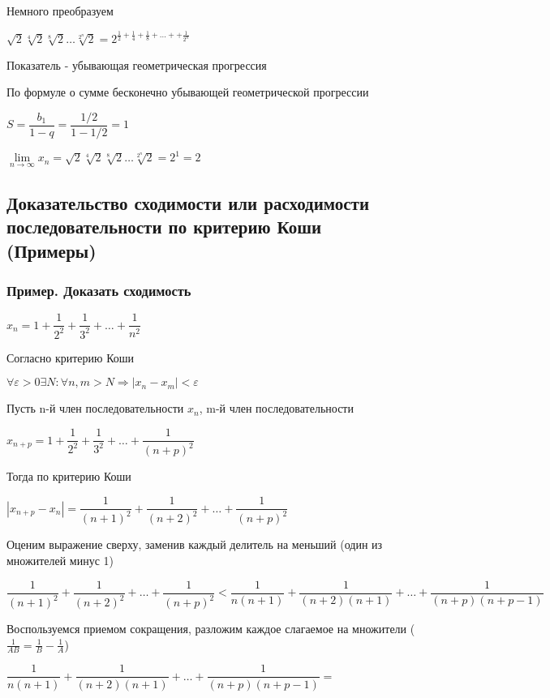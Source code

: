 Немного преобразуем

$ \sqrt{2} \sqrt[4]{2} \sqrt[8]{2} \ldots \sqrt[2^{n}]{2} =
2^{\frac{1}{2} + \frac{1}{4} + \frac{1}{8} + \ldots + + \frac{1}{2^{n}}}
$

Показатель - убывающая геометрическая прогрессия

По формуле о сумме бесконечно убывающей геометрической прогрессии

$S = \dfrac{b_{1}}{1 - q} = \dfrac{1/2}{1 - 1/2} = 1$

$  \lim\limits_{n \to \infty} x_{n} = 
\sqrt{2} \sqrt[4]{2} \sqrt[8]{2} \ldots \sqrt[2^{n}]{2} = 
2^{1} = 2 $


\subsection{Доказательство сходимости или расходимости последовательности по критерию Коши (Примеры)}

\subsubsection{Пример. Доказать сходимость}

$ x_{n} = 1 +
\dfrac{1}{2^{2}} + 
\dfrac{1}{3^{2}} + 
\ldots +
\dfrac{1}{n^{2}}
$

Согласно критерию Коши

$ \forall \varepsilon > 0 \exists N: \forall n,m > N \Rightarrow |x_{n} - x_{m}| < \varepsilon $

Пусть n-й член последовательности $ x_{n} $, 
m-й член последовательности 

$ x_{n+p} = 1 + \dfrac{1}{2^{2}} + 
\dfrac{1}{3^{2}} + 
\ldots +
\dfrac{1}{(n+p)^{2}} $

Тогда по критерию Коши

$ |x_{n+p} - x_{n}| = 
\dfrac{1}{(n+1)^{2}} +
\dfrac{1}{(n+2)^{2}} +
\ldots +
\dfrac{1}{(n+p)^{2}} $

Оценим выражение сверху, заменив каждый делитель на меньший (один из множителей минус 1)

$ 
\dfrac{1}{(n+1)^{2}} +
\dfrac{1}{(n+2)^{2}} +
\ldots +
\dfrac{1}{(n+p)^{2}}
<
\dfrac{1}{n(n+1)} +
\dfrac{1}{(n+2)(n+1)} +
\ldots +
\dfrac{1}{(n+p)(n+p-1)}
$

Воспользуемся приемом сокращения, разложим каждое слагаемое на множители 
($ \frac{1}{AB} = \frac{1}{B} - \frac{1}{A} $)

$
\dfrac{1}{n(n+1)} +
\dfrac{1}{(n+2)(n+1)} +
\ldots +
\dfrac{1}{(n+p)(n+p-1)} =
$

